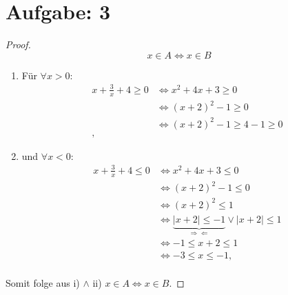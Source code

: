 \documentclass{exam}
\begin{document}
\pagebreak

\section*{Aufgabe: 3}
\begin{proof}
    \begin{displaymath}
        x \in A  \Leftrightarrow x \in B
    \end{displaymath}
    \begin{enumerate}[label=\roman*)]
        \item 	Für $\forall x > 0$: \begin{align*}
                  x + \frac{3}{x} + 4 \ge 0 & \Leftrightarrow x^2 +  4x + 3 \ge 0             \\
                                            & \Leftrightarrow {(x + 2)}^2  - 1 \ge 0          \\
                                            & \Leftrightarrow {(x + 2)}^2  - 1 \ge 4 -1 \ge 0 \\,
              \end{align*}

        \item 	und $\forall x < 0$: \begin{align*}
                  x + \frac{3}{x} + 4 \le 0 & \Leftrightarrow x^2 +  4x + 3 \le 0                                                                   \\
                                            & \Leftrightarrow {(x + 2)}^2  - 1 \le 0                                                                \\
                                            & \Leftrightarrow {(x + 2)}^2  \le 1                                                                    \\
                                            & \Leftrightarrow \underbrace{ \mid x+2 \mid \le -1}_{\Rightarrow\Leftarrow} \lor \mid x + 2 \mid \le 1 \\
                                            & \Leftrightarrow -1 \le x + 2 \le 1                                                                    \\
                                            & \Leftrightarrow -3 \le x  \le -1,                                                                     \\
              \end{align*}

    \end{enumerate}
    Somit folge aus i) $\land$ ii) $x \in A \Leftrightarrow x \in B$.
\end{proof}
\end{document}
